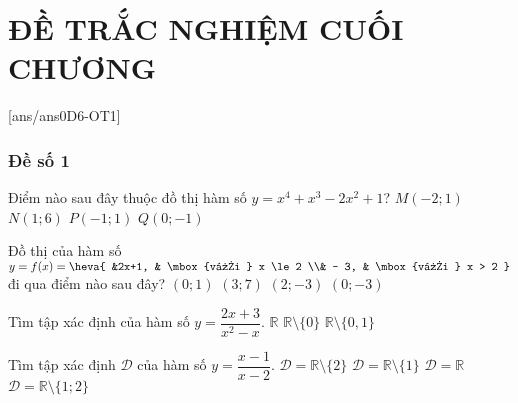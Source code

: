 \section*{ĐỀ TRẮC NGHIỆM CUỐI CHƯƠNG}
[ans/ans0D6-OT1]
\setcounter{ex}{0}
\subsubsection{Đề số 1}
\begin{ex}%
	Điểm nào sau đây thuộc đồ thị hàm số $y=x^4+x^3-2x^2+1$?
	\choice
	{\True $M(-2;1)$}
	{$N(1;6)$}
	{$P(-1;1)$}
	{$Q(0;-1)$}
\end{ex}

	\begin{ex}%
		Đồ thị của hàm số $y =f(x) = \heva{
			&2x+1, & \mbox{với } x \le 2 \\&
			- 3, & \mbox{với } x > 2
		}$
		đi qua điểm nào sau đây?
		\choice
		{\True$\left( {0;1} \right)$}
		{$\left( {3;7} \right)$}
		{$\left( {2;-3} \right)$}
		{$\left( {0; - 3} \right)$}
		\loigiai{
		
		}
	\end{ex}
	
	\begin{ex}%
		Tìm tập xác định của hàm số $y=\dfrac{2x+3}{x^2-x}$.
		{$\mathbb{R}$}
		{$\mathbb{R}\setminus\{0\}$}
		{\True $\mathbb{R}\setminus\{0,1\}$}
	\end{ex}
	

	
	\begin{ex}%
		Tìm tập xác định $\mathcal{D}$ của hàm số $y=\dfrac{x-1}{x-2}$.
		\choice
		{\True $\mathcal{D}=\mathbb{R}\setminus\{2\}$}
		{$\mathcal{D}=\mathbb{R}\setminus\{1\}$}
		{$\mathcal{D}=\mathbb{R}$}
		{$\mathcal{D}=\mathbb{R}\setminus\{1;2\}$}
	\end{ex}
	
